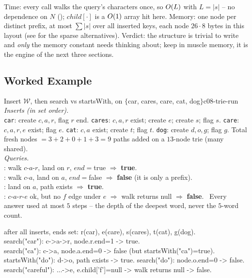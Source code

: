 \begin{complexitybox}
Time: every call walks the query's characters once, so $O(L)$ with $L=|s|$ -- no dependence on $N$
(); $\mathit{child}[\cdot]$ is a $O(1)$ array hit here. Memory: one node per
distinct prefix, at most $\sum |s|$ over all inserted keys, each node $26\cdot 8$ bytes in this layout
(see  for the sparse alternatives). Verdict: the structure is trivial to write and
\emph{only} the memory constant needs thinking about; keep  in muscle memory, it is
the engine of the next three sections.
\end{complexitybox}

\subsection{Worked Example}

\begin{example}{Insert $\mathcal{W}$, then search vs startsWith, on $\{$car, cares, care, cat, dog$\}$}{c08-trie-run}
\emph{Inserts (in set order).}\\
\texttt{car}: create $c,a,r$, flag $r$ end. \quad \texttt{cares}: $c,a,r$ exist; create $e$; create $s$;
flag $s$. \quad \texttt{care}: $c,a,r,e$ exist; flag $e$. \quad \texttt{cat}: $c,a$ exist; create $t$;
flag $t$. \quad \texttt{dog}: create $d,o,g$; flag $g$. Total fresh nodes $=3+2+0+1+3=9$ paths added on
a $13$-node trie (many shared).\\[2pt]
\emph{Queries.}\\
: walk $c$-$a$-$r$, land on $r$, $\mathit{end}{=}$true $\Rightarrow$ \textbf{true}.\\
: walk $c$-$a$, land on $a$, $\mathit{end}{=}$false $\Rightarrow$ \textbf{false} (it is
only a prefix).\\
: land on $a$, path exists $\Rightarrow$ \textbf{true}.\\
: $c$-$a$-$r$-$e$ ok, but no $f$ edge under $e$ $\Rightarrow$ walk returns null
$\Rightarrow$ \textbf{false}. \quad \checkmark\ Every answer used at most $5$ steps -- the depth of the
deepest word, never the $5$-word count.
\end{example}
\begin{tracebox}
after all inserts, ends set: r(car), e(care), s(cares), t(cat), g(dog).\\
search("car"): c->a->r, node.r.end=1 -> true.\\
search("ca"):  c->a,   node.a.end=0 -> false (but startsWith("ca")=true).\\
startsWith("do"): d->o, path exists -> true. search("do"): node.o.end=0 -> false.\\
search("careful"): ...->e, e.child['f']=null -> walk returns null -> false.
\end{tracebox}

